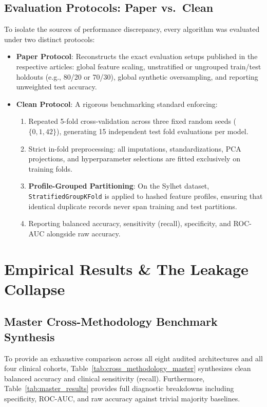 \documentclass[journal,twocolumn]{IEEEtran}
\begin{document}
\subsection{Evaluation Protocols: Paper vs.\ Clean}
To isolate the sources of performance discrepancy, every algorithm was evaluated under two distinct protocols:
\begin{itemize}
    \item \textbf{Paper Protocol}: Reconstructs the exact evaluation setups published in the respective articles: global feature scaling, unstratified or ungrouped train/test holdouts (e.g., 80/20 or 70/30), global synthetic oversampling, and reporting unweighted test accuracy.
    \item \textbf{Clean Protocol}: A rigorous benchmarking standard enforcing:
    \begin{enumerate}
        \item Repeated 5-fold cross-validation across three fixed random seeds ($\{0, 1, 42\}$), generating 15 independent test fold evaluations per model.
        \item Strict in-fold preprocessing: all imputations, standardizations, PCA projections, and hyperparameter selections are fitted exclusively on training folds.
        \item \textbf{Profile-Grouped Partitioning}: On the Sylhet dataset, \texttt{StratifiedGroupKFold} is applied to hashed feature profiles, ensuring that identical duplicate records never span training and test partitions.
        \item Reporting balanced accuracy, sensitivity (recall), specificity, and ROC-AUC alongside raw accuracy.
    \end{enumerate}
\end{itemize}

\section{Empirical Results \& The Leakage Collapse}
\label{sec:results}

\subsection{Master Cross-Methodology Benchmark Synthesis}
To provide an exhaustive comparison across all eight audited architectures and all four clinical cohorts, Table~\ref{tab:cross_methodology_master} synthesizes clean balanced accuracy and clinical sensitivity (recall). Furthermore, Table~\ref{tab:master_results} provides full diagnostic breakdowns including specificity, ROC-AUC, and raw accuracy against trivial majority baselines.
\end{document}
